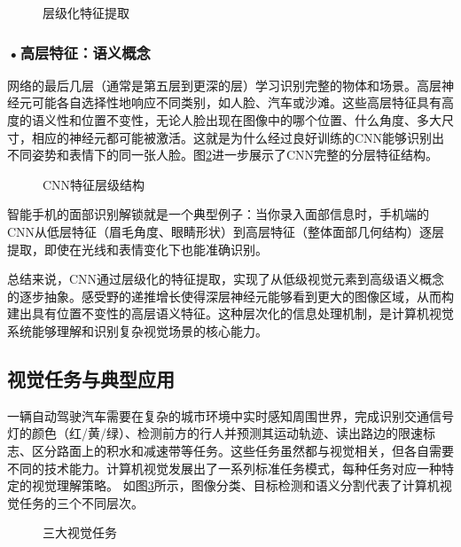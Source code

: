 \begin{figure}[H]
\centering
{}
\caption{层级化特征提取}
\label{fig:ch2_2_17}
\end{figure}




\subsubsection*{\textbf{•高层特征：语义概念}}

网络的最后几层（通常是第五层到更深的层）学习识别完整的物体和场景。高层神经元可能各自选择性地响应不同类别，如人脸、汽车或沙滩。这些高层特征具有高度的语义性和位置不变性，无论人脸出现在图像中的哪个位置、什么角度、多大尺寸，相应的神经元都可能被激活。这就是为什么经过良好训练的CNN能够识别出不同姿势和表情下的同一张人脸。图\ref{fig:ch2_2_18}进一步展示了CNN完整的分层特征结构。


\begin{figure}[H]
\centering
{}
\caption{CNN特征层级结构}
\label{fig:ch2_2_18}
\end{figure}


智能手机的面部识别解锁就是一个典型例子：当你录入面部信息时，手机端的CNN从低层特征（眉毛角度、眼睛形状）到高层特征（整体面部几何结构）逐层提取，即使在光线和表情变化下也能准确识别。

总结来说，CNN通过层级化的特征提取，实现了从低级视觉元素到高级语义概念的逐步抽象。感受野的递推增长使得深层神经元能够看到更大的图像区域，从而构建出具有位置不变性的高层语义特征。这种层次化的信息处理机制，是计算机视觉系统能够理解和识别复杂视觉场景的核心能力。





\subsection{视觉任务与典型应用}
一辆自动驾驶汽车需要在复杂的城市环境中实时感知周围世界，完成识别交通信号灯的颜色（红/黄/绿）、检测前方的行人并预测其运动轨迹、读出路边的限速标志、区分路面上的积水和减速带等任务。这些任务虽然都与视觉相关，但各自需要不同的技术能力。计算机视觉发展出了一系列标准任务模式，每种任务对应一种特定的视觉理解策略。
如图\ref{fig:ch2_2_19}所示，图像分类、目标检测和语义分割代表了计算机视觉任务的三个不同层次。

\begin{figure}[H]
\centering
{}
\caption{三大视觉任务}
\label{fig:ch2_2_19}
\end{figure}



